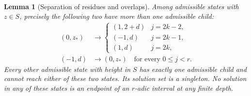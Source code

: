 \documentclass[11pt]{article}
\newtheorem{lemma}[theorem]{Lemma}
\theoremstyle{definition}
\theoremstyle{remark}
\begin{document}
\begin{lemma}[Separation of residues and overlaps]\label{lem:rigidity}
Among admissible states with $z\in S$, precisely the following two have
more than one admissible child:
\begin{align}
 (0,z_*)&\longrightarrow
 \begin{cases}
 (1,2+d)&j=2k-2,\\
 (-1,d)&j=2k-1,\\
 (1,d)&j=2k,
 \end{cases}\label{eq:coreone}\\
 (-1,d)&\longrightarrow(0,z_*)\quad\text{for every }0\le j<r.
 \label{eq:coretwo}
\end{align}
Every other admissible state with height in $S$ has exactly one admissible
child and cannot reach either of these two states. Its solution set is a
singleton. No solution in any of these states is an endpoint of an
$r$-adic interval at any finite depth.
\end{lemma}
\end{document}
